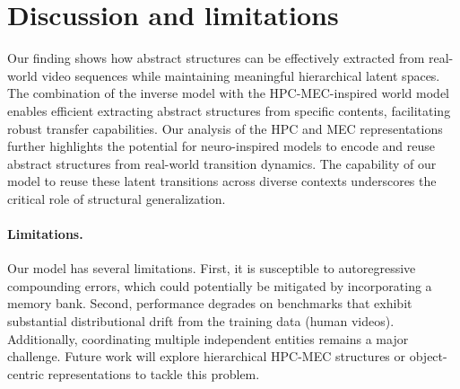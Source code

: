 \section{Discussion and limitations}
\label{sec:discussion}
Our finding shows how abstract structures can be effectively extracted from real-world video sequences while maintaining meaningful hierarchical latent spaces. 
The combination of the inverse model with the HPC-MEC-inspired world model enables efficient extracting abstract structures from specific contents, facilitating robust transfer capabilities.
Our analysis of the HPC and MEC representations further highlights the potential for neuro-inspired models to encode and reuse abstract structures from real-world transition dynamics.
The capability of our model to reuse these latent transitions across diverse contexts underscores the critical role of structural generalization.


\vspace{-0.2cm}
\paragraph{Limitations.} 
Our model has several limitations. First, it is susceptible to autoregressive compounding errors, which could potentially be mitigated by incorporating a memory bank. Second, performance degrades on benchmarks that exhibit substantial distributional drift from the training data (human videos).
Additionally, coordinating multiple independent entities remains a major challenge. Future work will explore hierarchical HPC-MEC structures or object-centric representations to tackle this problem.
